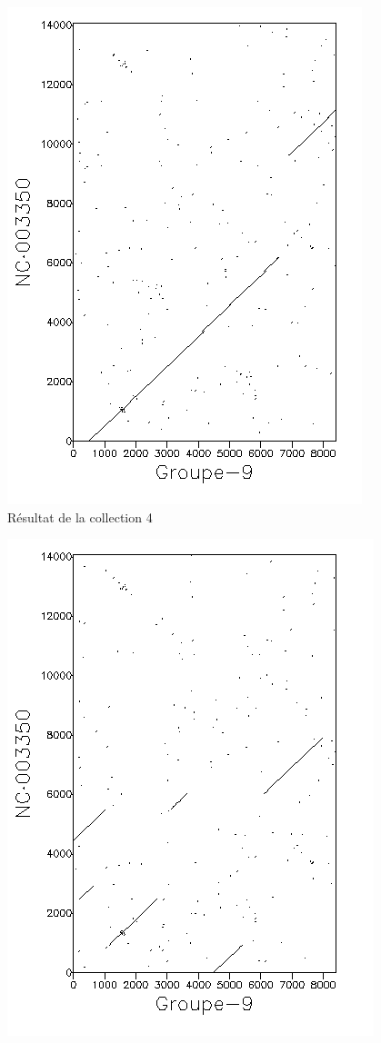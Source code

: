 \begin{figure}[!ht]
	\begin{minipage}[r]{.46\linewidth}
		\begin{center}
		\includegraphics[scale= 0.7]{../res/cible4.png}
		Résultat de la collection 4
	\end{center}
\end{minipage} \hfill
\begin{minipage}[c]{.46 \linewidth}
	\begin{center}
			\includegraphics[scale= 0.7]{../res/cible4-ic.png}

\end{center}
\end{minipage}
\end{figure}
